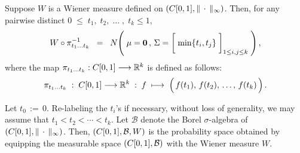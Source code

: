 \begin{theorem}
\label{WienerFiniteDimensionalDistributions}
\mbox{}\vskip 0.2cm
\noindent
Suppose $W$ is a Wiener measure defined on $\left(C[0,1],\Vert\,\cdot\,\Vert_{\infty}\right)$.
Then, for any pairwise distinct \;$0 \;\leq\; t_{1},\; t_{2}, \;\ldots\;,\; t_{k} \leq 1$,
		\begin{equation*}
		W \circ \pitok^{-1}
		\;\; = \;\;
		N\!\left(\;
		\mathbf{\mu} = \mathbf{0}\,,\,
		\Sigma = \left[\;\min\{\overset{{\color{white}1}}{t}_{i},t_{j}\}\;\right]_{1\leq i,j\leq k}
		\;\right),
		\end{equation*}
		where the map \;$\pi_{t_{1}\ldots t_{k}} : C[0,1] \longrightarrow \mathbb{R}^{k}$\; is defined as follows:
		\begin{equation*}
		\pitok \;:\; \Czo \longrightarrow \Re^{k} \;:\;
		f \;\longmapsto\; \left(\,\overset{{\color{white}.}}{f}(t_{1}),\,f(t_{2}),\,\ldots,\,f(t_{k})\,\right).
		\end{equation*}
\end{theorem}
\proof
Let $t_{0} \,:= \, 0$.
Re-labeling the $t_{i}$'s if necessary, without loss of generality, we may assume that
$t_{1} < t_{2} < \cdots < t_{k}$.
Let $\mathcal{B}$ denote the Borel $\sigma$-algebra of $\left(C[0,1],\Vert\,\cdot\,\Vert_{\infty}\right)$.
Then, $\left(C[0,1],\mathcal{B},W\right)$ is the probability space
obtained by equipping the measurable space $\left(C[0,1],\mathcal{B}\right)$
with the Wiener measure $W$.

